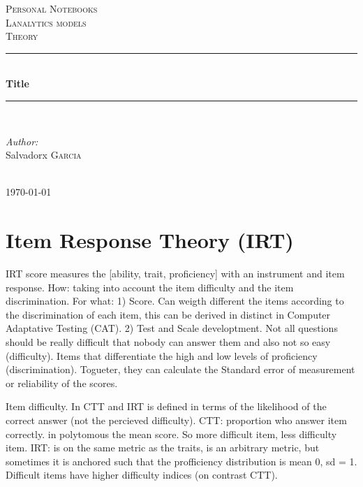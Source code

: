 \documentclass[12pt]{article}
\begin{document}
\begin{titlepage}

\newcommand{\HRule}{\rule{\linewidth}{0.5mm}} 
\center
\textsc{\LARGE Personal Notebooks}\\[1.5cm] 
\textsc{\Large Lanalytics models}\\[0.5cm] 
\textsc{\large Theory}\\[0.5cm] 

\HRule \\[0.4cm]
{ \huge \bfseries Title}\\[0.4cm] 
\HRule \\[1.5cm]

\begin{minipage}{0.4\textwidth}
\begin{flushleft} \large
\emph{Author:}\\
Salvadorx \textsc{Garcia}
\end{flushleft}
\end{minipage}
\begin{minipage}{0.4\textwidth}
\begin{flushright} \large
\end{flushright}
\end{minipage}\\[4cm]

{\large \today}\\[3cm] 
\vfill 
\end{titlepage}

\tableofcontents 

\newpage 

\section{Item Response Theory (IRT)}

IRT score measures the [ability, trait, proficiency] with an instrument and item response. How: taking into account the item difficulty and the item discrimination. For what: 1) Score. Can weigth different the items according to the discrimination of each item, this can be derived in distinct in Computer Adaptative Testing (CAT). 2) Test and Scale developtment. Not all questions should be really difficult that nobody can answer them and also not so easy (difficulty). Items that differentiate the high and low levels of proficiency (discrimination). Togueter, they can calculate the Standard error of measurement or reliability of the scores.


Item difficulty. In CTT and IRT is defined in terms of the likelihood of the correct answer (not the percieved difficulty). CTT: proportion who answer item correctly. in polytomous the mean score. So more difficult item, less difficulty item. IRT: is on the same metric as the traits, is an arbitrary metric, but sometimes it is anchored such that the profficiency distribution is mean 0, sd = 1. Difficult items have higher difficulty indices (on contrast CTT).
\end{document}
